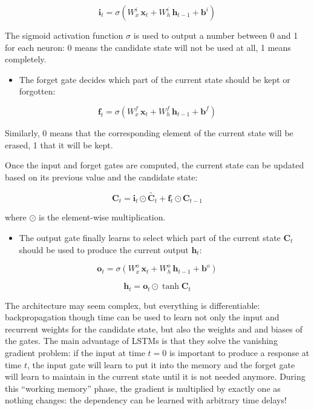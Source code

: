 \documentclass[
  letterpaper,
  DIV=11,
  numbers=noendperiod]{scrreprt}
\providecommand{\tightlist}{%
  \setlength{\itemsep}{0pt}\setlength{\parskip}{0pt}}\usepackage{longtable,booktabs,array}
\begin{document}
\[
    \mathbf{i}_t = \sigma(W^i_x \, \mathbf{x}_{t} + W^i_h \, \mathbf{h}_{t-1} + \mathbf{b}^i)
\]

The sigmoid activation function \(\sigma\) is used to output a number
between 0 and 1 for each neuron: 0 means the candidate state will not be
used at all, 1 means completely.

\begin{itemize}
\tightlist
\item
  The forget gate decides which part of the current state should be kept
  or forgotten:
\end{itemize}

\[
    \mathbf{f}_t = \sigma(W^f_x \, \mathbf{x}_{t} + W^f_h \, \mathbf{h}_{t-1} + \mathbf{b}^f)
\]

Similarly, 0 means that the corresponding element of the current state
will be erased, 1 that it will be kept.

Once the input and forget gates are computed, the current state can be
updated based on its previous value and the candidate state:

\[
   \mathbf{C}_t =  \mathbf{i}_t \odot \tilde{\mathbf{C}_t} + \mathbf{f}_t \odot \mathbf{C}_{t-1}
\]

where \(\odot\) is the element-wise multiplication.

\begin{itemize}
\tightlist
\item
  The output gate finally learns to select which part of the current
  state \(\mathbf{C}_t\) should be used to produce the current output
  \(\mathbf{h}_t\):
\end{itemize}

\[
    \mathbf{o}_t = \sigma(W^o_x \, \mathbf{x}_{t} + W^o_h \, \mathbf{h}_{t-1} + \mathbf{b}^o)
\]

\[
    \mathbf{h}_t = \mathbf{o}_t \odot \tanh \mathbf{C}_t
\]

The architecture may seem complex, but everything is differentiable:
backpropagation though time can be used to learn not only the input and
recurrent weights for the candidate state, but also the weights and and
biases of the gates. The main advantage of LSTMs is that they solve the
vanishing gradient problem: if the input at time \(t=0\) is important to
produce a response at time \(t\), the input gate will learn to put it
into the memory and the forget gate will learn to maintain in the
current state until it is not needed anymore. During this ``working
memory'' phase, the gradient is multiplied by exactly one as nothing
changes: the dependency can be learned with arbitrary time delays!
\end{document}
